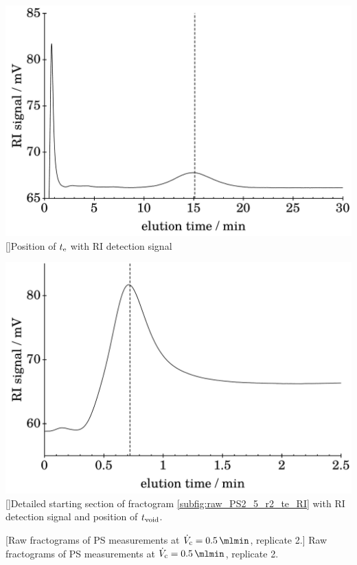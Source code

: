 \begin{minipage}{\linewidth}
\begin{center}
\begin{minipage}{\subFigSize}
    \end{minipage}
    \\
    \begin{minipage}{\subFigSize} 
      \includegraphics[width=\linewidth]{./images/data/rawPlots/img_PS_VC_05_rep2_te_RI.pdf}
            []{Position of $t_\text{e}$ with RI detection signal}
      \label{subfig:raw_PS2_5_r2_te_RI}
    \end{minipage}
    \begin{minipage}{\subFigSize}
      \includegraphics[width=\linewidth]{./images/data/rawPlots/img_PS_VC_05_rep2_t0_RI.pdf}
            []{Detailed starting section of fractogram \ref{subfig:raw_PS2_5_r2_te_RI}
        with RI detection signal and position of $t_\text{void}$.}
    \end{minipage}
  \end{center}
  \vspace*{-4ex}    
        [Raw fractograms of PS measurements at $\Vc = \SI{0.5}{\mlmin}$, replicate 2.]{
    Raw fractograms of PS 
    measurements at $\Vc = \SI{0.5}{\mlmin}$, replicate 2.}
  \label{fig:raw_PS_0_5_rep2} 
\end{minipage}
